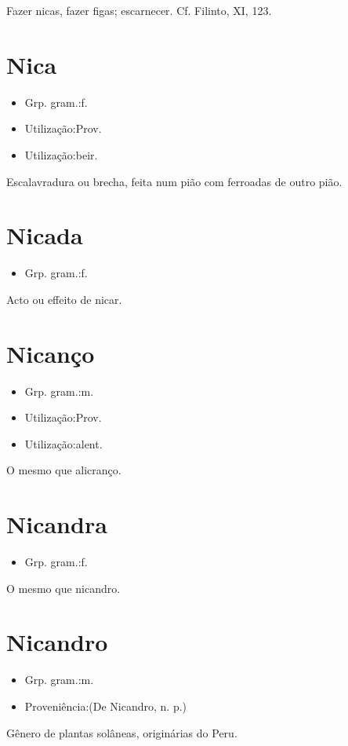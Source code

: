 \textunderscore Fazer nicas\textunderscore , fazer figas; escarnecer. Cf. Filinto, XI, 123.
\section{Nica}
\begin{itemize}
\item {Grp. gram.:f.}
\end{itemize}
\begin{itemize}
\item {Utilização:Prov.}
\end{itemize}
\begin{itemize}
\item {Utilização:beir.}
\end{itemize}
Escalavradura ou brecha, feita num pião com ferroadas de outro pião.
\section{Nicada}
\begin{itemize}
\item {Grp. gram.:f.}
\end{itemize}
Acto ou effeito de nicar.
\section{Nicanço}
\begin{itemize}
\item {Grp. gram.:m.}
\end{itemize}
\begin{itemize}
\item {Utilização:Prov.}
\end{itemize}
\begin{itemize}
\item {Utilização:alent.}
\end{itemize}
O mesmo que \textunderscore alicranço\textunderscore .
\section{Nicandra}
\begin{itemize}
\item {Grp. gram.:f.}
\end{itemize}
O mesmo que \textunderscore nicandro\textunderscore .
\section{Nicandro}
\begin{itemize}
\item {Grp. gram.:m.}
\end{itemize}
\begin{itemize}
\item {Proveniência:(De \textunderscore Nicandro\textunderscore , n. p.)}
\end{itemize}
Gênero de plantas solâneas, originárias do Peru.
